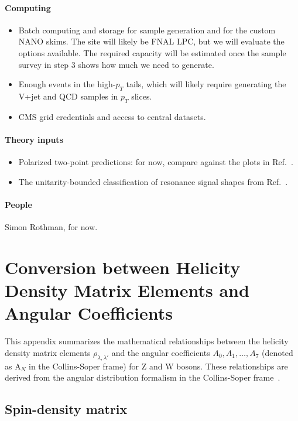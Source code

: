 \documentclass[11pt]{article}
\begin{document}
\paragraph{Computing}
\begin{itemize}
    \item Batch computing and storage for sample generation and for the custom NANO skims. The site will likely be FNAL LPC, but we will evaluate the options available. The required capacity will be estimated once the sample survey in step 3 shows how much we need to generate.
    \item Enough events in the high-\(p_T\) tails, which will likely require generating the V+jet and QCD samples in \(p_T\) slices.
    \item CMS grid credentials and access to central datasets.
\end{itemize}

\paragraph{Theory inputs}
\begin{itemize}
    \item Polarized two-point predictions: for now, compare against the plots in Ref.~\cite{Gao:2026hoj}.
    \item The unitarity-bounded classification of resonance signal shapes from Ref.~\cite{Ricci:2026fkj}.
\end{itemize}

\paragraph{People}
Simon Rothman, for now.

\appendix

\section{Conversion between Helicity Density Matrix Elements and Angular Coefficients}

This appendix summarizes the mathematical relationships between the helicity density matrix elements $\rho_{\lambda,\lambda'}$ and the angular coefficients $A_0, A_1, \ldots, A_7$ (denoted as A$_N$ in the Collins-Soper frame) for Z and W bosons. These relationships are derived from the angular distribution formalism in the Collins-Soper frame~\cite{CMS:2015cyj,ATLAS:2016rnf,Gao:2026hoj}.


\subsection{Spin-density matrix}
\end{document}
